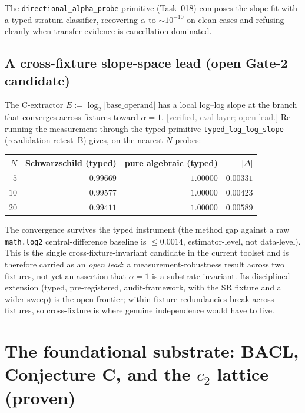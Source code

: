 \documentclass[11pt,a4paper]{article}
\newcommand{\status}[1]{\textcolor{gray}{\small\textsf{[#1]}}}
\begin{document}
\noindent The \texttt{directional\_alpha\_probe} primitive (Task~018) composes the slope fit with a typed-stratum classifier, recovering $\alpha$ to $\sim10^{-10}$ on clean cases and refusing cleanly when transfer evidence is cancellation-dominated.

\subsection{A cross-fixture slope-space lead (open Gate-2 candidate)}\label{sec:crossfixture-slope}

The C-extractor $E:=\log_2|\text{base\_operand}|$ has a local log--log slope at the branch that converges across fixtures toward $\alpha=1$. \status{verified, eval-layer; open lead.} Re-running the measurement through the typed primitive \texttt{typed\_log\_log\_slope} (revalidation retest~B) gives, on the nearest $N$ probes:

\begin{center}
\begin{tabular}{rrrr}
\toprule
$N$ & Schwarzschild (typed) & pure algebraic (typed) & $|\Delta|$\\
\midrule
$5$  & $0.99669$ & $1.00000$ & $0.00331$\\
$10$ & $0.99577$ & $1.00000$ & $0.00423$\\
$20$ & $0.99411$ & $1.00000$ & $0.00589$\\
\bottomrule
\end{tabular}
\end{center}

\noindent The convergence survives the typed instrument (the method gap against a raw \texttt{math.log2} central-difference baseline is $\le0.0014$, estimator-level, not data-level). This is the single cross-fixture-invariant candidate in the current toolset and is therefore carried as an \emph{open lead}: a measurement-robustness result across two fixtures, not yet an assertion that $\alpha=1$ is a substrate invariant. Its disciplined extension (typed, pre-registered, audit-framework, with the SR fixture and a wider sweep) is the open frontier; within-fixture redundancies break across fixtures, so cross-fixture is where genuine independence would have to live.

\section{The foundational substrate: BACL, Conjecture C, and the $c_2$ lattice (proven)}\label{sec:substrate}
\end{document}
